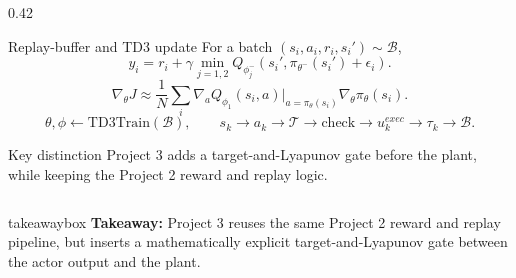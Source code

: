 \documentclass[aspectratio=169]{beamer}
\newcommand{\takeawaybox}[1]{%
\vspace{0.01cm}
\begin{center}
\begin{beamercolorbox}[wd=0.94\textwidth,sep=3pt,center,rounded=true,shadow=false]{takeawaybox}
\scriptsize
\textbf{\textcolor{maroon1}{Takeaway:}} #1
\end{beamercolorbox}
\end{center}
}
\begin{document}
\begin{frame}
\begin{columns}[T,onlytextwidth]
\begin{column}{0.42\textwidth}
\begin{block}{Replay-buffer and TD3 update}
\justifying
For a batch \((s_i,a_i,r_i,s_i')\sim\mathcal{B}\),
\[
y_i=r_i+\gamma \min_{j=1,2}Q_{\phi_j^-}\!\left(s_i',\pi_{\theta^-}(s_i')+\epsilon_i\right).
\]
\[
\nabla_\theta J \approx \frac{1}{N}\sum_i \nabla_a Q_{\phi_1}(s_i,a)\vert_{a=\pi_\theta(s_i)}\nabla_\theta \pi_\theta(s_i).
\]
\[
\theta,\phi \leftarrow \mathrm{TD3Train}(\mathcal{B}),\qquad
s_k \rightarrow a_k \rightarrow \mathcal{T} \rightarrow \text{check} \rightarrow u_k^{exec} \rightarrow \tau_k \rightarrow \mathcal{B}.
\]
\end{block}

\vspace{0.02cm}

\begin{block}{Key distinction}
\justifying
Project 3 adds a target-and-Lyapunov gate before the plant, while keeping the Project 2 reward and replay logic.
\end{block}
\end{column}

\end{columns}

\takeawaybox{Project 3 reuses the same Project 2 reward and replay pipeline, but inserts a mathematically explicit target-and-Lyapunov gate between the actor output and the plant.}

\end{frame}
\end{document}
